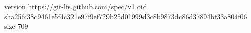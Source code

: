 version https://git-lfs.github.com/spec/v1
oid sha256:38c9461e5f4c321e97f9ef729b25d01999d3c8b9873dc86d37894bf33a804f06
size 709
